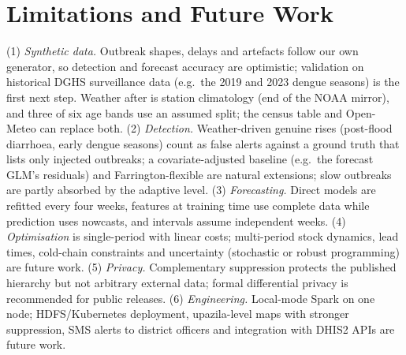 \documentclass[conference]{IEEEtran}
\begin{document}
\section{Limitations and Future Work}\label{sec:limits}
(1) \emph{Synthetic data.} Outbreak shapes, delays and artefacts follow our own generator, so detection and
forecast accuracy are optimistic; validation on historical DGHS surveillance data (e.g.\ the 2019 and 2023
dengue seasons) is the first next step. Weather after \WxObservedUntil{} is station climatology (end of the NOAA
mirror), and three of six age bands use an assumed split; the census table and Open-Meteo can replace both.
(2) \emph{Detection.} Weather-driven genuine rises (post-flood diarrhoea, early dengue seasons) count as false
alerts against a ground truth that lists only injected outbreaks; a covariate-adjusted baseline (e.g.\ the
forecast GLM's residuals) and Farrington-flexible \cite{farrington1996} are natural extensions; slow outbreaks
are partly absorbed by the adaptive level. (3) \emph{Forecasting.} Direct models are refitted every four weeks,
features at training time use complete data while prediction uses nowcasts, and intervals assume independent
weeks. (4) \emph{Optimisation} is single-period with linear costs; multi-period stock dynamics, lead times,
cold-chain constraints and uncertainty (stochastic or robust programming) are future work. (5) \emph{Privacy.}
Complementary suppression protects the published hierarchy but not arbitrary external data; formal
differential privacy is recommended for public releases. (6) \emph{Engineering.} Local-mode Spark on one node;
HDFS/Kubernetes deployment, upazila-level maps with stronger suppression, SMS alerts to district officers and
integration with DHIS2 APIs are future work.
\end{document}
